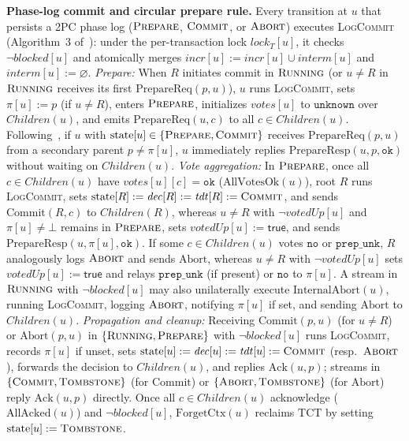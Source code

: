 \documentclass[sigconf,nonacm]{acmart}
\newcommand{\stRun}{\textsc{Running}}
\newcommand{\stPrep}{\textsc{Prepare}}
\newcommand{\stCom}{\textsc{Commit}}
\newcommand{\stAbt}{\textsc{Abort}}
\newcommand{\stTomb}{\textsc{Tombstone}}
\newcommand{\Children}{\mathit{Children}}
\newcommand{\incr}{\mathit{incr}}
\newcommand{\interm}{\mathit{interm}}
\newcommand{\tdt}{\mathit{tdt}}
\newcommand{\dec}{\mathit{dec}}
\newcommand{\blocked}{\mathit{blocked}}
\begin{document}
\textbf{Phase-log commit and circular prepare rule.} Every transition at
\(u\) that persists a 2PC phase log (\(\stPrep\), \(\stCom\), or \(\stAbt\))
executes \textsc{LogCommit} (Algorithm~3 of~\cite{tree2pc}): under the
per-transaction lock \(\mathit{lock}_T[u]\), it checks \(\neg\blocked[u]\)
and atomically merges \(\incr[u] := \incr[u] \cup \interm[u]\) and
\(\interm[u] := \varnothing\).
\emph{Prepare:} When \(R\) initiates commit in \(\stRun\) (or \(u \neq R\)
in \(\stRun\) receives its first \(\mathrm{PrepareReq}(p, u)\)), \(u\) runs
\textsc{LogCommit}, sets \(\pi[u] := p\) (if \(u \neq R\)), enters
\(\stPrep\), initializes \(\mathit{votes}[u]\) to \(\mathtt{unknown}\) over
\(\Children(u)\), and emits \(\mathrm{PrepareReq}(u, c)\) to all
\(c \in \Children(u)\). Following~\cite[\S4.6]{tree2pc}, if \(u\) with
\(\mathrm{state}[u] \in \{\stPrep, \stCom\}\) receives
\(\mathrm{PrepareReq}(p, u)\) from a secondary parent \(p \neq \pi[u]\),
\(u\) immediately replies \(\mathrm{PrepareResp}(u, p, \mathtt{ok})\)
without waiting on \(\Children(u)\).
\emph{Vote aggregation:} In \(\stPrep\), once all \(c \in \Children(u)\)
have \(\mathit{votes}[u][c] = \mathtt{ok}\) (\(\mathrm{AllVotesOk}(u)\)),
root \(R\) runs \textsc{LogCommit}, sets \(\mathrm{state}[R] := \dec[R] :=
\tdt[R] := \stCom\), and sends \(\mathrm{Commit}(R, c)\) to
\(\Children(R)\), whereas \(u \neq R\) with \(\neg\mathit{votedUp}[u]\) and
\(\pi[u] \neq \bot\) remains in \(\stPrep\), sets \(\mathit{votedUp}[u] :=
\mathsf{true}\), and sends \(\mathrm{PrepareResp}(u, \pi[u], \mathtt{ok})\).
If some \(c \in \Children(u)\) votes \(\mathtt{no}\) or \(\mathtt{prep\_unk}\),
\(R\) analogously logs \(\stAbt\) and sends \(\mathrm{Abort}\), whereas
\(u \neq R\) with \(\neg\mathit{votedUp}[u]\) sets \(\mathit{votedUp}[u] :=
\mathsf{true}\) and relays \(\mathtt{prep\_unk}\) (if present) or
\(\mathtt{no}\) to \(\pi[u]\). A stream in \(\stRun\) with \(\neg\blocked[u]\)
may also unilaterally execute \(\mathrm{InternalAbort}(u)\), running
\textsc{LogCommit}, logging \(\stAbt\), notifying \(\pi[u]\) if set, and
sending \(\mathrm{Abort}\) to \(\Children(u)\).
\emph{Propagation and cleanup:} Receiving \(\mathrm{Commit}(p, u)\) (for
\(u \neq R\)) or \(\mathrm{Abort}(p, u)\) in \(\{\stRun, \stPrep\}\) with
\(\neg\blocked[u]\) runs \textsc{LogCommit}, records \(\pi[u]\) if unset,
sets \(\mathrm{state}[u] := \dec[u] := \tdt[u] := \stCom\) (resp.\
\(\stAbt\)), forwards the decision to \(\Children(u)\), and replies
\(\mathrm{Ack}(u, p)\); streams in \(\{\stCom, \stTomb\}\) (for
\(\mathrm{Commit}\)) or \(\{\stAbt, \stTomb\}\) (for \(\mathrm{Abort}\))
reply \(\mathrm{Ack}(u, p)\) directly. Once all \(c \in \Children(u)\)
acknowledge (\(\mathrm{AllAcked}(u)\)) and \(\neg\blocked[u]\),
\(\mathrm{ForgetCtx}(u)\) reclaims \(\mathrm{TCT}\) by setting
\(\mathrm{state}[u] := \stTomb\).
\end{document}
